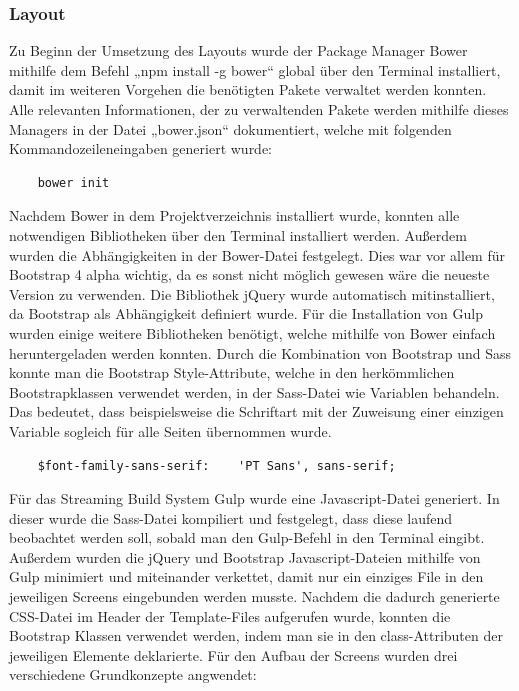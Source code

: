     \subsubsection{Layout}

	Zu Beginn der Umsetzung des Layouts wurde der Package Manager Bower mithilfe dem Befehl „npm install -g bower“ global über den Terminal installiert, damit im weiteren Vorgehen die benötigten Pakete verwaltet werden konnten. Alle relevanten Informationen, der zu verwaltenden Pakete werden mithilfe dieses Managers in der Datei „bower.json“ dokumentiert, welche mit folgenden Kommandozeileneingaben generiert wurde:
	\lstset{language = bash}
  	\begin{lstlisting}
  	bower init
  	\end{lstlisting}
Nachdem Bower in dem Projektverzeichnis installiert wurde, konnten alle notwendigen Bibliotheken über den Terminal installiert werden. Außerdem wurden die Abhängigkeiten in der Bower-Datei festgelegt. Dies war vor allem für Bootstrap 4 alpha wichtig, da es sonst nicht möglich gewesen wäre die neueste Version zu verwenden. Die Bibliothek jQuery wurde automatisch mitinstalliert, da Bootstrap als Abhängigkeit definiert wurde. Für die Installation von Gulp wurden einige weitere Bibliotheken benötigt, welche mithilfe von Bower einfach heruntergeladen werden konnten.
Durch die Kombination von Bootstrap und Sass konnte man die Bootstrap Style-Attribute, welche in den herkömmlichen Bootstrapklassen verwendet werden, in der Sass-Datei wie Variablen behandeln. Das bedeutet, dass beispielsweise die Schriftart mit der Zuweisung einer einzigen Variable sogleich für alle Seiten übernommen wurde.
	\lstset{language = html}
  	\begin{lstlisting}
  	$font-family-sans-serif:	'PT Sans', sans-serif;
  	\end{lstlisting}
Für das Streaming Build System Gulp wurde eine Javascript-Datei generiert. In dieser wurde die Sass-Datei kompiliert und festgelegt, dass diese laufend beobachtet werden soll, sobald man den Gulp-Befehl in den Terminal eingibt. Außerdem wurden die jQuery und Bootstrap Javascript-Dateien mithilfe von Gulp minimiert und miteinander verkettet, damit nur ein einziges File in den jeweiligen Screens eingebunden werden musste.
Nachdem die dadurch generierte CSS-Datei im Header der Template-Files aufgerufen wurde, konnten die Bootstrap Klassen verwendet werden, indem man sie in den class-Attributen der jeweiligen Elemente deklarierte.
Für den Aufbau der Screens wurden drei verschiedene Grundkonzepte angwendet:
